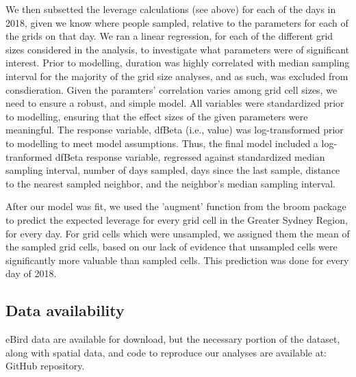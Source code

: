 \documentclass[9pt,twocolumn,twoside,lineno]{pnas-new}
\begin{document}
{We then subsetted the leverage calculations (see above) for each of the days in 2018, given we know where people sampled, relative to the parameters for each of the grids on that day. We ran a linear regression, for each of the different grid sizes considered in the analysis, to investigate what parameters were of significant interest. Prior to modelling, duration was highly correlated with median sampling interval for the majority of the grid size analyses, and as such, was excluded from consdieration. Given the paramters' correlation varies among grid cell sizes, we need to ensure a robust, and simple model. All variables were standardized prior to modelling, ensuring that the effect sizes of the given parameters were meaningful. The response variable, dfBeta (i.e., value) was log-transformed prior to modelling to meet model assumptions. Thus, the final model included a log-tranformed dfBeta response variable, regressed against standardized median sampling interval, number of days sampled, days since the last sample, distance to the nearest sampled neighbor, and the neighbor's median sampling interval.

After our model was fit, we used the 'augment' function from the broom package \cite{robinson2018broom} to predict the expected leverage for every grid cell in the Greater Sydney Region, for every day. For grid cells which were unsampled, we assigned them the mean of the sampled grid cells, based on our lack of evidence that unsampled cells were significantly more valuable than sampled cells. This prediction was done for every day of 2018.

\subsection*{Data availability} eBird data are available for download, but the necessary portion of the dataset, along with spatial data, and code to reproduce our analyses are available at: GitHub repository.
}

\showmatmethods{} %


\showacknow{} %


\end{document}
